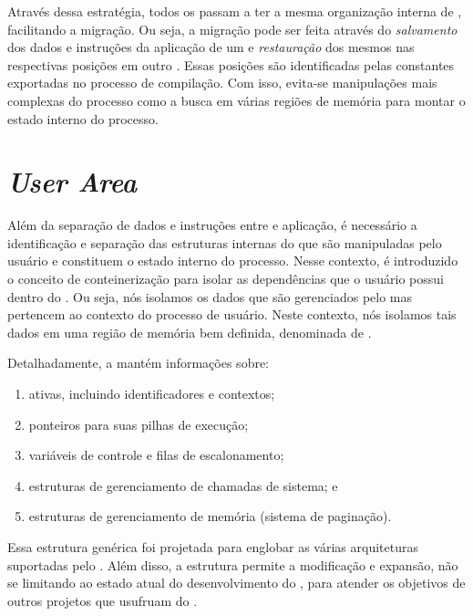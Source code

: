     Através dessa estratégia, todos os \clusters passam a ter a mesma organização interna de , facilitando a migração. Ou seja, a migração pode ser feita através do \textit{salvamento} dos dados e instruções da aplicação de um \cluster e \textit{restauração} dos mesmos nas respectivas posições em outro \cluster. Essas posições são identificadas pelas constantes exportadas no processo de compilação. Com isso, evita-se manipulações mais complexas do processo como a busca em várias regiões de memória para montar o estado interno do processo.

    
\section{\textit{User Area}}
\label{sec.uarea}

    Além da separação de dados e instruções entre  e aplicação, é necessário a identificação e separação das estruturas internas do \so que são manipuladas pelo usuário e constituem o estado interno do processo. Nesse contexto, é introduzido o conceito de conteinerização para isolar as dependências que o usuário possui dentro do \cluster. Ou seja, nós isolamos os dados que são gerenciados pelo  mas pertencem ao contexto do processo de usuário. Neste contexto, nós isolamos tais dados em uma região de memória bem definida, denominada de \uarea. 

    Detalhadamente, a \uarea mantém informações sobre:
    \begin{enumerate}[label=(\roman*)]
        \item \threads ativas, incluindo identificadores e contextos;
        \item ponteiros para suas pilhas de execução; 
        \item variáveis de controle e filas de escalonamento;
        \item estruturas de gerenciamento de chamadas de sistema; e
        \item estruturas de gerenciamento de memória (\eg sistema de paginação).
    \end{enumerate}

    Essa estrutura genérica foi projetada para englobar as várias arquiteturas suportadas pelo \nanvix. Além disso, a estrutura permite a modificação e expansão, não se limitando ao estado atual do desenvolvimento do \nanvix, para atender os objetivos de outros projetos que usufruam do \nanvix.

